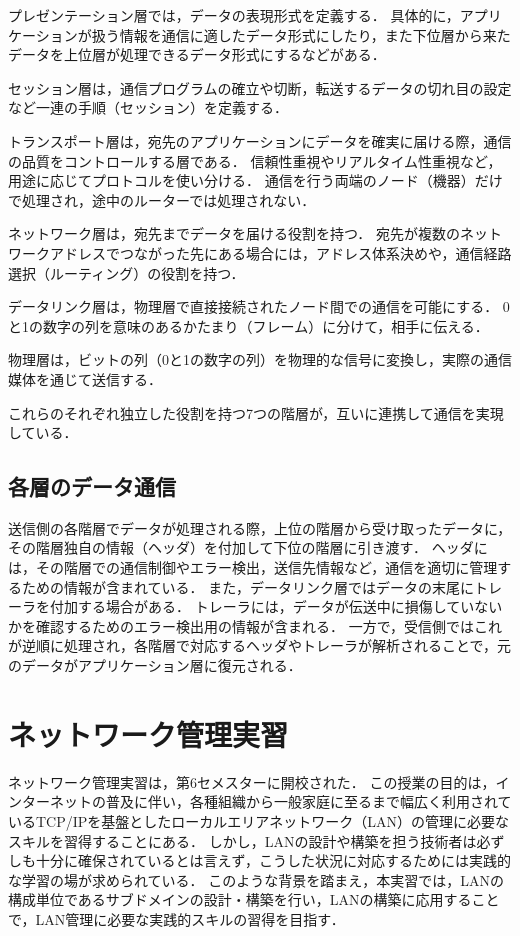 \documentclass[12pt,a4j,titlepage]{ltjsarticle}
\begin{document}
プレゼンテーション層では，データの表現形式を定義する．
具体的に，アプリケーションが扱う情報を通信に適したデータ形式にしたり，また下位層から来たデータを上位層が処理できるデータ形式にするなどがある．

セッション層は，通信プログラムの確立や切断，転送するデータの切れ目の設定など一連の手順（セッション）を定義する．

トランスポート層は，宛先のアプリケーションにデータを確実に届ける際，通信の品質をコントロールする層である．
信頼性重視やリアルタイム性重視など，用途に応じてプロトコルを使い分ける．
通信を行う両端のノード（機器）だけで処理され，途中のルーターでは処理されない．

ネットワーク層は，宛先までデータを届ける役割を持つ．
宛先が複数のネットワークアドレスでつながった先にある場合には，アドレス体系決めや，通信経路選択（ルーティング）の役割を持つ．

データリンク層は，物理層で直接接続されたノード間での通信を可能にする．
0と1の数字の列を意味のあるかたまり（フレーム）に分けて，相手に伝える．

物理層は，ビットの列（0と1の数字の列）を物理的な信号に変換し，実際の通信媒体を通じて送信する．

これらのそれぞれ独立した役割を持つ7つの階層が，互いに連携して通信を実現している．

\subsection{各層のデータ通信}
送信側の各階層でデータが処理される際，上位の階層から受け取ったデータに，その階層独自の情報（ヘッダ）を付加して下位の階層に引き渡す．
ヘッダには，その階層での通信制御やエラー検出，送信先情報など，通信を適切に管理するための情報が含まれている．
また，データリンク層ではデータの末尾にトレーラを付加する場合がある．
トレーラには，データが伝送中に損傷していないかを確認するためのエラー検出用の情報が含まれる．
一方で，受信側ではこれが逆順に処理され，各階層で対応するヘッダやトレーラが解析されることで，元のデータがアプリケーション層に復元される．

\section{ネットワーク管理実習}
ネットワーク管理実習は，第6セメスターに開校された．
この授業の目的は，インターネットの普及に伴い，各種組織から一般家庭に至るまで幅広く利用されているTCP/IPを基盤としたローカルエリアネットワーク（LAN）の管理に必要なスキルを習得することにある．
しかし，LANの設計や構築を担う技術者は必ずしも十分に確保されているとは言えず，こうした状況に対応するためには実践的な学習の場が求められている．
このような背景を踏まえ，本実習では，LANの構成単位であるサブドメインの設計・構築を行い，LANの構築に応用することで，LAN管理に必要な実践的スキルの習得を目指す．
\end{document}
